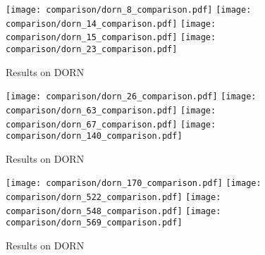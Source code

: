 \begin{figure}
  \texttt{[image: comparison/dorn\_8\_comparison.pdf]}
  \texttt{[image: comparison/dorn\_14\_comparison.pdf]}
  \texttt{[image: comparison/dorn\_15\_comparison.pdf]}
  \texttt{[image: comparison/dorn\_23\_comparison.pdf]}
  \caption{Results on DORN}
\end{figure}
\begin{figure}
  \texttt{[image: comparison/dorn\_26\_comparison.pdf]}
  \texttt{[image: comparison/dorn\_63\_comparison.pdf]}
  \texttt{[image: comparison/dorn\_67\_comparison.pdf]}
  \texttt{[image: comparison/dorn\_140\_comparison.pdf]}
  \caption{Results on DORN}
\end{figure}
\begin{figure}
  \texttt{[image: comparison/dorn\_170\_comparison.pdf]}
  \texttt{[image: comparison/dorn\_522\_comparison.pdf]}
  \texttt{[image: comparison/dorn\_548\_comparison.pdf]}
  \texttt{[image: comparison/dorn\_569\_comparison.pdf]}
  \caption{Results on DORN}
\end{figure}
